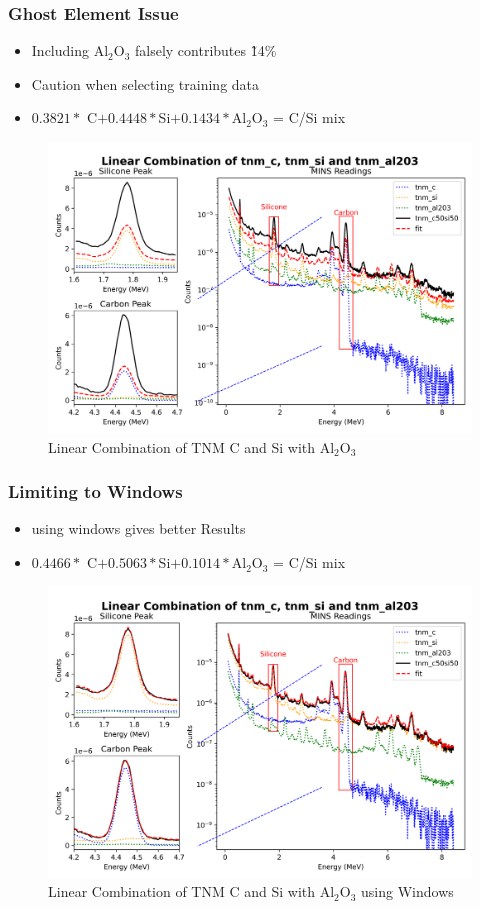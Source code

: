 \documentclass[xcolor=dvipsnames,envcountsect]{beamer}
\begin{document}
\begin{frame}
  \frametitle{Ghost Element Issue}
  \begin{itemize}
     \item Including Al$_2$O$_3$ falsely contributes \~ 14\%
     \item Caution when selecting training data
     \item $0.3821 *$ C$ + 0.4448 * $Si$ + 0.1434 * $Al$_2$O$_3$ = C/Si mix
  \end{itemize}
  \begin{figure}
      \centering
      \includegraphics[width=.5\linewidth]{Figures/LinearCombination2TNMCF.png}
      \caption{Linear Combination of TNM C and Si with Al$_2$O$_3$}
      \label{fig:LinearCombination2TNMCF}
  \end{figure}
\end{frame}

\begin{frame}
  \frametitle{Limiting to Windows}
  \begin{itemize}
     \item using windows gives better Results
    \item $0.4466 *$ C$ + 0.5063 * $Si$ + 0.1014 * $Al$_2$O$_3$ = C/Si mix
  \end{itemize}
  \begin{figure}
      \centering
      \includegraphics[width=.5\linewidth]{Figures/LinearCombination3TNMCF.png}
      \caption{Linear Combination of TNM C and Si with Al$_2$O$_3$ using Windows}
      \label{fig:LinearCombination3TNMCF}
  \end{figure}
\end{frame}
\end{document}
